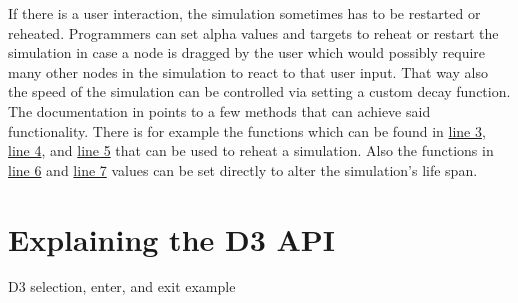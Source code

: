 If there is a user interaction, the simulation sometimes has to be restarted or reheated. Programmers can set alpha values and targets to reheat or restart the simulation in case a node is dragged by the user which would possibly require many other nodes in the simulation to react to that user input. That way also the speed of the simulation can be controlled via setting a custom decay function. The documentation in \cite[/d3-force/blob/master/README.md]{D3Github} points to a few methods that can achieve said functionality. There is for example the functions which can be found in \hyperref[prog:simulation]{line 3}, \hyperref[prog:simulation]{line 4}, and \hyperref[prog:simulation]{line 5} that can be used to reheat a simulation. Also the functions in \hyperref[prog:simulation]{line 6} and \hyperref[prog:simulation]{line 7} values can be set directly to alter the simulation's life span.




\section{Explaining the D3 API} 

\begin{program}
\caption{D3 selection, enter, and exit example}
\label{prog:d3selection}
\end{program}

